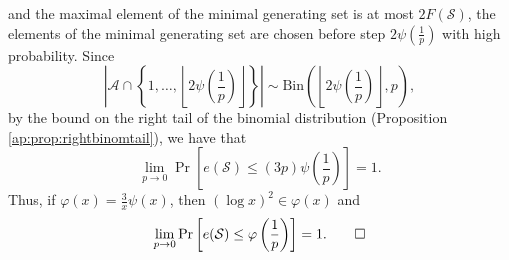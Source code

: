 and the maximal element of the minimal generating set is at most $2F(\mathcal{S})$, the elements of the minimal generating set are chosen before step $2\psi\left(\frac{1}{p}\right)$ with high probability. Since \[\left|\mathcal{A}\cap\left\{1, \ldots, \left\lfloor2\psi\left(\frac{1}{p}\right)\right \rfloor\right\}\right| \sim \mathrm{Bin}\left(\left\lfloor2\psi\left(\frac{1}{p}\right)\right \rfloor, p\right),\] by the bound on the right tail of the binomial distribution (Proposition \ref{ap:prop:rightbinomtail}), we have that
\[\lim_{p \to 0}\Pr\left[e(\mathcal{S}) \leq (3p)\psi\left(\frac{1}{p}\right)\right] = 1.\]
Thus, if $\varphi(x) = \frac{3}{x} \psi\left(x\right)$, then $(\log x)^2 \in \varphi(x)$ and 
\[\lim_{p \to 0}\Pr\left[e(\mathcal{S}) \leq \varphi\left(\frac{1}{p}\right)\right] = 1.\qed \]
